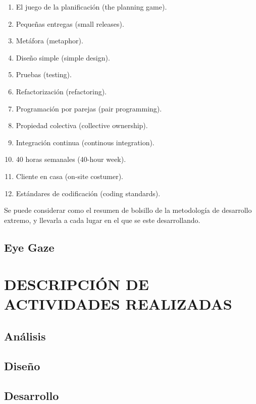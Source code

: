 \documentclass[12pt]{book} %
\begin{document}
			\begin{enumerate}
				\item El juego de la planificación (the planning game).
				\item Pequeñas entregas (small releases).
				\item Metáfora (metaphor).
				\item Diseño simple (simple design).
				\item Pruebas (testing).
				\item Refactorización (refactoring).
				\item Programación por parejas (pair programming).
				\item Propiedad colectiva (collective ownership).
				\item Integración continua (continous integration).
				\item 40 horas semanales (40-hour week).
				\item Cliente en casa (on-site costumer).
				\item Estándares de codificación (coding standards).
			\end{enumerate}
			
			Se puede considerar como el resumen de bolsillo de la metodología de desarrollo extremo, y llevarla a cada lugar en el que se este desarrollando.\\

\section{Eye Gaze }

\chapter{DESCRIPCIÓN DE ACTIVIDADES REALIZADAS}
\thispagestyle{empty}
\newpage
\section{Análisis}

\section{Diseño}

\section{Desarrollo}
\end{document}
